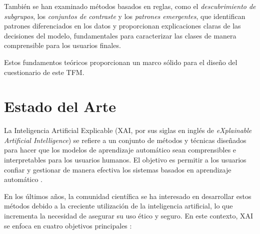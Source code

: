 También se han examinado métodos basados en reglas, como el \textit{descubrimiento de subgrupos}, los \textit{conjuntos de contraste} y los \textit{patrones emergentes}, que identifican patrones diferenciados en los datos y proporcionan explicaciones claras de las decisiones del modelo, fundamentales para caracterizar las clases de manera comprensible para los usuarios finales.

Estos fundamentos teóricos proporcionan un marco sólido para el diseño del cuestionario de este TFM.


\chapter{Estado del Arte}

La Inteligencia Artificial Explicable (XAI, por sus siglas en inglés de \emph{eXplainable Artificial Intelligence}) se refiere a un conjunto de métodos y técnicas diseñados para hacer que los modelos de aprendizaje automático sean comprensibles e interpretables para los usuarios humanos. El objetivo es permitir a los usuarios confiar y gestionar de manera efectiva los sistemas basados en aprendizaje automático \cite{gunning2019xai}. 

En los últimos años, la comunidad científica se ha interesado en desarrollar estos métodos debido a la creciente utilización de la inteligencia artificial, lo que incrementa la necesidad de asegurar su uso ético y seguro. En este contexto, XAI se enfoca en cuatro objetivos principales \cite{curso-xai}:

